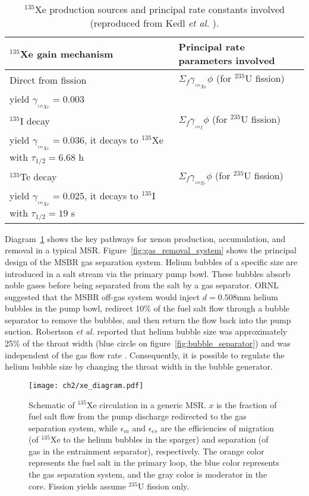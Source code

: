 \begin{table}[ht!]
	\caption{$^{135}$Xe production sources and principal rate constants 
		involved
		(reproduced from Kedl \emph{et al.} \cite{kedl_development_1967}).}
	\centering
	\begin{tabularx}{\textwidth}{b  b}
		\hline \textbf{$^{135}$Xe gain mechanism} & \textbf{Principal rate 
			parameters involved}  	\\ [5pt] \hline 
		Direct from fission & $\Sigma_f \gamma_{_{^{135}Xe}}\phi$ (for 
		$^{235}$U fission) \\
		yield $\gamma_{_{^{135}Xe}}\!\!\!=0.003$ & \\ [5pt] \hline 
		$^{135}$I decay     & $\Sigma_f \gamma_{_{^{135}I}}\phi$ (for 
		$^{235}$U fission) \\
		yield $\gamma_{_{^{135}Xe}}\!\!\!=0.036$, it decays to $^{135}$Xe with 
		$\tau_{1/2}=6.68$ h & 			                    \\	[5pt]	\hline 
		$^{135}$Te decay    & $\Sigma_f \gamma_{_{^{135}Te}}\phi$ (for 
		$^{235}$U 		fission) \\
		yield $\gamma_{_{^{135}Xe}}\!\!\!=0.025$, 
		it decays to $^{135}$I with $\tau_{1/2}=19$ s 
		& 			                    \\ [5pt]	\hline
	\end{tabularx}
	\label{tab:xe_gain}
\end{table}
Diagram~\ref{fig:xe_diagram} shows the key pathways for xenon production, 
accumulation, and removal in a typical \gls{MSR}. 
Figure~\ref{fig:gas_removal_system} shows the principal design of the  
\gls{MSBR} gas separation system. Helium bubbles of a specific size are 
introduced in a salt stream via the primary pump bowl. These bubbles absorb 
noble gases before being separated from the salt by a gas separator. 
\gls{ORNL} suggested that the \gls{MSBR} off-gas system would inject 
$d=0.508$mm helium bubbles in the pump bowl, redirect 10\% of the fuel salt 
flow through a bubble separator to remove the bubbles, and then return the 
flow back into the pump suction. Robertson \emph{et al.} reported that helium 
bubble size was approximately 25\% of the throat width (blue circle on 
figure~\ref{fig:bubble_separator}) and was independent of the gas flow rate 
\cite{robertson_conceptual_1971}. Consequently, it is possible to regulate the 
helium bubble size by changing the throat width in the bubble generator.
\begin{figure}[htp!] %
	\centering
	\texttt{[image: ch2/xe\_diagram.pdf]}
	\caption{Schematic of $^{135}$Xe circulation in a generic \gls{MSR}. $x$ 
	is the fraction of fuel salt flow from the pump discharge redirected to 
	the gas separation system, while $\epsilon_m$ and $\epsilon_{es}$ are the 
	efficiencies of migration (of $^{135}$Xe to the helium bubbles in the 
	sparger) and separation (of gas in the entrainment separator), 
	respectively. The orange color represents the fuel salt in the primary 
	loop, the blue color represents the gas separation system, and the gray 
	color is moderator in the core. Fission yields assume $^{235}$U fission 
	only.}
	\label{fig:xe_diagram}
\end{figure}
